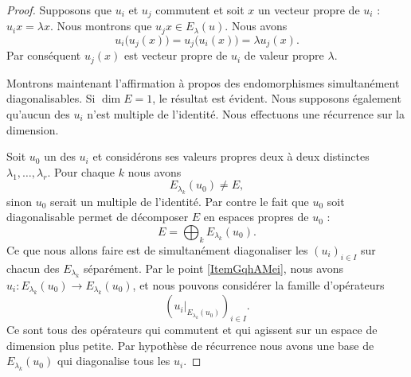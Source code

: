 \begin{proof}
    Supposons que \( u_i\) et \( u_j\) commutent et soit \( x\) un vecteur propre de \( u_i\) : \( u_ix=\lambda x\). Nous montrons que \( u_jx\in E_{\lambda}(u)\). Nous avons
    \begin{equation}
        u_i\big( u_j(x) \big)=u_j\big( u_i(x) \big)=\lambda u_j(x).
    \end{equation}
    Par conséquent \( u_j(x)\) est vecteur propre de \( u_i\) de valeur propre \( \lambda\).

    Montrons maintenant l'affirmation à propos des endomorphismes simultanément diagonalisables. Si \( \dim E=1\), le résultat est évident. Nous supposons également qu'aucun des \( u_i\) n'est multiple de l'identité. Nous effectuons une récurrence sur la dimension.

    Soit \( u_0\) un des \( u_i\) et considérons ses valeurs propres deux à deux distinctes \( \lambda_1,\ldots, \lambda_r\). Pour chaque \( k\) nous avons
    \begin{equation}
        E_{\lambda_k}(u_0)\neq E,
    \end{equation}
    sinon \( u_0\) serait un multiple de l'identité. Par contre le fait que \( u_0\) soit diagonalisable permet de décomposer \( E\) en espaces propres de \( u_0\) :
    \begin{equation}
        E=\bigoplus_{k}E_{\lambda_k}(u_0).
    \end{equation}
    Ce que nous allons faire est de simultanément diagonaliser les \( (u_i)_{i\in I}\) sur chacun des \( E_{\lambda_k}\) séparément. Par le point \ref{ItemGqhAMei}, nous avons \( u_i\colon E_{\lambda_k}(u_0)\to E_{\lambda_k}(u_0)\), et nous pouvons considérer la famille d'opérateurs
    \begin{equation}
        \left( u_i|_{E_{\lambda_k}(u_0)} \right)_{i\in I}.
    \end{equation}
    Ce sont tous des opérateurs qui commutent et qui agissent sur un espace de dimension plus petite. Par hypothèse de récurrence nous avons une base de \( E_{\lambda_k}(u_0)\) qui diagonalise tous les \( u_i\).
\end{proof}

